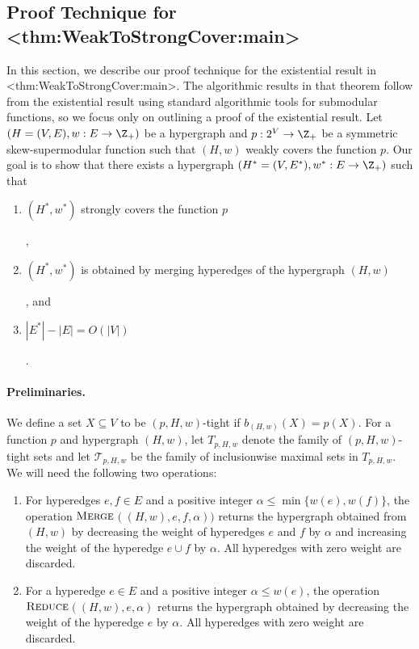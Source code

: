 \documentclass{article}
\def\Cref#1{<#1>}%
\newcommand{\merge}{\ensuremath{\textsc{Merge}}\xspace}
\newcommand{\reduce}{\ensuremath{\textsc{Reduce}}\xspace}
\begin{document}
\subsection{Proof Technique for \Cref{thm:WeakToStrongCover:main}}
In this section, we describe our proof technique for the existential result in \Cref{thm:WeakToStrongCover:main}. 
The algorithmic results in that theorem follow from the existential result using standard algorithmic tools for submodular functions, so we focus only on outlining a proof of the existential result. 
Let $(H=(V, E), w: E\rightarrow \Z_+)$ be a hypergraph and $p: 2^V\rightarrow \Z_+$ be a symmetric skew-supermodular function such that $(H, w)$ weakly covers the function $p$. Our goal is to show that there exists a hypergraph $(H^*=(V, E^*), w^*: E\rightarrow \Z_+)$ such that 
\begin{enumerate}[label=(\arabic*)]
    \item \hypertarget{WeakToStrong(1)}{$(H^*, w^*)$ strongly covers the function $p$},
    \item \hypertarget{WeakToStrong(2)}{$(H^*, w^*)$ is obtained by merging hyperedges of the hypergraph $(H, w)$}, and
    \item \hypertarget{WeakToStrong(3)}{$|E^*|-|E|=O(|V|)$}. 
\end{enumerate}

\paragraph{Preliminaries.} We define a set $X\subseteq V$ to be $(p, H, w)$-tight if $b_{(H, w)}(X) = p(X)$. For a function $p$ and hypergraph $(H, w)$, let $T_{p, H, w}$ denote the family of $(p,H, w)$-tight sets and let $\mathcal{T}_{p, H, w}$ be the family of inclusionwise maximal sets in $T_{p, H, w}$. We will need the following two operations: 
\begin{enumerate}[label=(\roman*)]
    \item For hyperedges $e, f\in E$ and a positive integer  $\alpha \le \min\{w(e), w(f)\}$, the operation \merge$((H, w), e, f, \alpha))$ returns the hypergraph obtained from $(H, w)$ by decreasing the weight of hyperedges $e$ and $f$ by $\alpha$ and increasing the weight of the hyperedge $e\cup f$ by $\alpha$. All hyperedges with zero weight are discarded.
    \item For a hyperedge $e\in E$ and a positive integer $\alpha\le w(e)$, the operation \reduce$((H, w), e, \alpha)$ returns the hypergraph obtained by decreasing the weight of the hyperedge $e$ by $\alpha$. All hyperedges with zero weight are discarded.
\end{enumerate}
 
\end{document}
